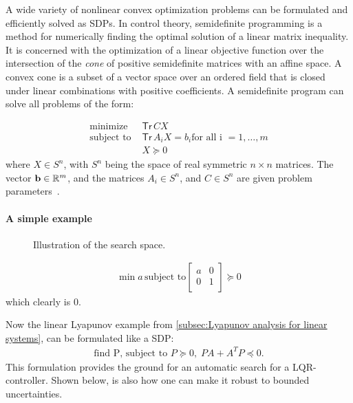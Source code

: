 A wide variety of nonlinear convex optimization problems can be formulated and
efficiently solved as \ac{SDP}s. In control theory, semidefinite programming is
a method for numerically finding the optimal solution of a linear matrix
inequality. It is concerned with the optimization of a linear objective function
over the intersection of the \textit{cone} of positive semidefinite matrices
with an affine space. A convex cone is a subset of a vector space over an
ordered field that is closed under linear combinations with positive
coefficients. A semidefinite program can solve all problems of the form:

\begin{align*}
  \text{minimize } &\textsf{Tr}\,CX \\
  \text{subject to } &\textsf{Tr}\,A_{i}X = b_{i} \text{for all i } = 1,\ldots,m\\
                   &X \succeq 0
\end{align*} 
where \(X \in S^n\), with \(S^n\) being the space of real symmetric \(n \times
n\) matrices. The vector \(\mathbf{b} \in \mathbb{R}^m\), and the matrices \(A_i \in
S^n\), and \(C \in S^n\) are given problem
parameters~\cite{wolkowiczHandbookSemidefiniteProgramming2000}.

\paragraph{A simple example}
\label{subsec:A simple example}

\begin{figure}
  \centering
  
  \caption{Illustration of the search space.}
\end{figure}

\begin{align*}
  \min{a}\, \text{subject to}
  \begin{bmatrix}
    a & 0 \\
    0 & 1 \\
  \end{bmatrix}
  \succeq 0
\end{align*}
which clearly is \(0\).

Now the linear Lyapunov example from \cref{subsec:Lyapunov analysis for linear
  systems}, can be formulated like a \ac{SDP}:
\begin{align*}
  \text{find P, subject to } P \succeq 0, \; PA + A^{T}P \preceq 0.
\end{align*}
This formulation provides the ground for an automatic search for a
\ac{LQR}-controller. Shown below, is also how one can make it robust to bounded
uncertainties.

